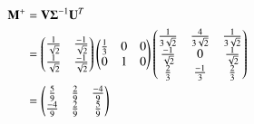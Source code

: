 \begin{align}
\mathbf{M}^{+} &= \mathbf{V}\mathbf{\Sigma}^{-1}\mathbf{U}^T \\
&= \begin{pmatrix}\frac{1}{\sqrt{2}} & \frac{-1}{\sqrt{2}} \\
	\frac{1}{\sqrt{2}} & \frac{-1}{\sqrt{2}}\end{pmatrix} \begin{pmatrix}\frac{1}{3} & 0 & 0 \\ 0 & 1 & 0\end{pmatrix} \begin{pmatrix}\frac{1}{3\sqrt{2}} & \frac{4}{3\sqrt{2}} & \frac{1}{3\sqrt{2}} \\ \frac{-1}{\sqrt{2}} & 0 &  \frac{1}{\sqrt{2}} \\  \frac{2}{3} & \frac{-1}{3} & \frac{2}{3}\end{pmatrix}\\
&= \label{eq:solutions/4/48/5/eq7}\begin{pmatrix}\frac{5}{9} & \frac{2}{9} & \frac{-4}{9} \\ \frac{-4}{9} & \frac{2}{9} & \frac{5}{9}\end{pmatrix}
\end{align}

